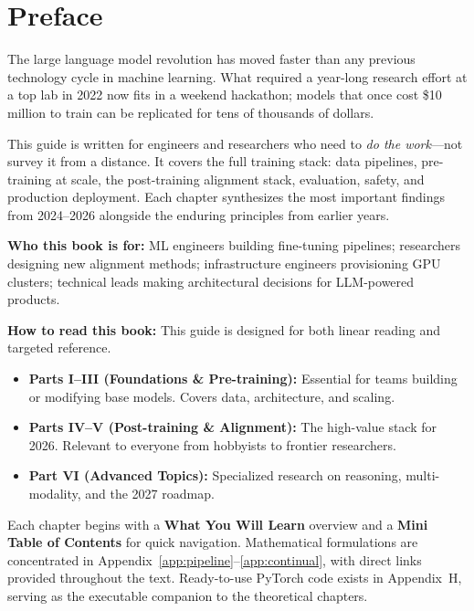 \chapter*{Preface}

The large language model revolution has moved faster than any previous technology cycle in machine learning. What required a year-long research effort at a top lab in 2022 now fits in a weekend hackathon; models that once cost \$10 million to train can be replicated for tens of thousands of dollars.

This guide is written for engineers and researchers who need to \emph{do the work}---not survey it from a distance. It covers the full training stack: data pipelines, pre-training at scale, the post-training alignment stack, evaluation, safety, and production deployment. Each chapter synthesizes the most important findings from 2024--2026 alongside the enduring principles from earlier years.

\textbf{Who this book is for:} ML engineers building fine-tuning pipelines; researchers designing new alignment methods; infrastructure engineers provisioning GPU clusters; technical leads making architectural decisions for LLM-powered products.

\textbf{How to read this book:} This guide is designed for both linear reading and targeted reference.
\begin{itemize}
  \item \textbf{Parts I--III (Foundations \& Pre-training):} Essential for teams building or modifying base models. Covers data, architecture, and scaling.
  \item \textbf{Parts IV--V (Post-training \& Alignment):} The high-value stack for 2026. Relevant to everyone from hobbyists to frontier researchers.
  \item \textbf{Part VI (Advanced Topics):} Specialized research on reasoning, multi-modality, and the 2027 roadmap.
\end{itemize}

Each chapter begins with a \textbf{What You Will Learn} overview and a \textbf{Mini Table of Contents} for quick navigation. Mathematical formulations are concentrated in Appendix~\ref{app:pipeline}--\ref{app:continual}, with direct links provided throughout the text. Ready-to-use PyTorch code exists in Appendix~H, serving as the executable companion to the theoretical chapters.
